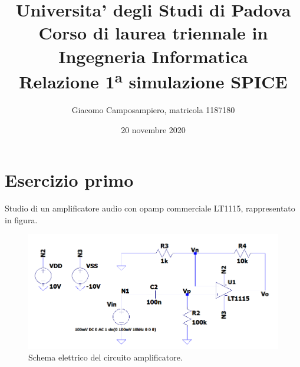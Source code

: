 \documentclass[a4paper,10pt]{article}
\begin{document}
%

   
   \title{{\large Universita' degli Studi di Padova \\ } {\normalsize Corso di laurea triennale in Ingegneria Informatica}\\ \vspace{1.8cm} \textbf{ Relazione 1\textsuperscript{a} simulazione SPICE}}

   \author{Giacomo Camposampiero, matricola 1187180}
          
   \date{20 novembre 2020}

   \maketitle
   
   \vspace{2.2cm}
   
   \renewcommand{\contentsname}{Indice}      
   \tableofcontents
   
   \newpage
  
\section{Esercizio primo}
Studio di un amplificatore audio con opamp commerciale LT1115, rappresentato in figura.
\begin{figure}[h!]
  	\centering
 	\includegraphics[width=0.7\linewidth]{ckt1.png}
  	\caption{Schema elettrico del circuito amplificatore.}
  	\label{fig:ckt1}
\end{figure}
\end{document}
